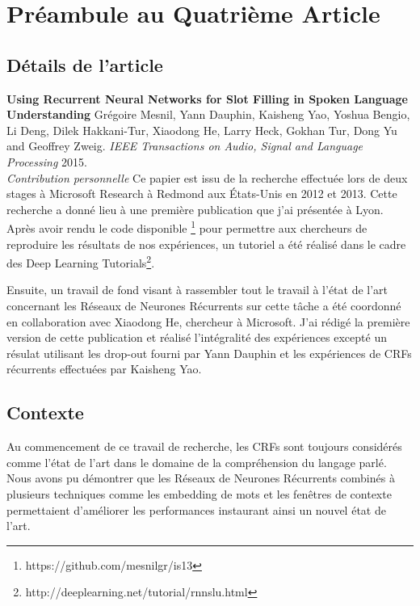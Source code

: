 \chapter{Pr\'{e}ambule au Quatri\`{e}me Article }

\section{D\'{e}tails de l'article}

{\bf Using Recurrent Neural Networks for Slot Filling in Spoken Language
Understanding} Grégoire Mesnil, Yann Dauphin, Kaisheng Yao, Yoshua Bengio, Li
Deng, Dilek Hakkani-Tur, Xiaodong He, Larry Heck, Gokhan Tur, Dong Yu and
Geoffrey Zweig. {\it IEEE Transactions on Audio, Signal and Language
Processing} 2015. \\

{\it Contribution personnelle} Ce papier est issu de la recherche effectuée
lors de deux stages à Microsoft Research à Redmond aux États-Unis en 2012 et
2013. Cette recherche a donné lieu à une première publication
\citep{mesnil-et-al-Interspeech2013} que j'ai présentée à Lyon. Après avoir
rendu le code disponible \footnote{https://github.com/mesnilgr/is13} pour
permettre aux chercheurs de reproduire les résultats de nos expériences, un
tutoriel a été réalisé dans le cadre des Deep Learning
Tutorials\footnote{http://deeplearning.net/tutorial/rnnslu.html}.

Ensuite, un travail de fond visant à rassembler tout le travail à l'état de
l'art concernant les Réseaux de Neurones Récurrents sur cette tâche a été
coordonné en collaboration avec Xiaodong He, chercheur à Microsoft. J'ai rédigé
la première version de cette publication et réalisé l'intégralité des
expériences excepté un résulat utilisant les drop-out fourni par Yann Dauphin
et les expériences de CRFs récurrents effectuées par Kaisheng Yao. 

\section{Contexte}

Au commencement de ce travail de recherche, les CRFs sont toujours considérés
comme l'état de l'art dans le domaine de la compréhension du langage parlé.
Nous avons pu démontrer que les Réseaux de Neurones Récurrents combinés à
plusieurs techniques comme les embedding de mots et les fenêtres de contexte
permettaient d'améliorer les performances instaurant ainsi un nouvel état de
l'art.

